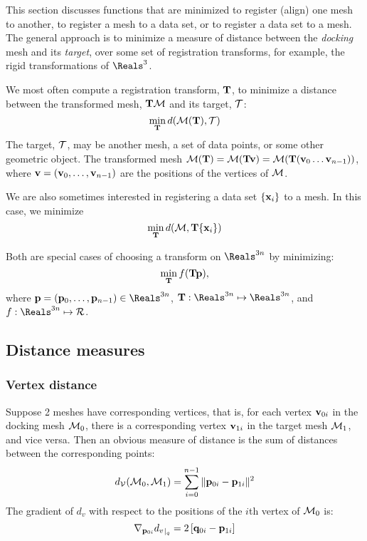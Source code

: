 \label{sec:registration}

This section discusses functions that are minimized
to register (align) one mesh to another,
to register a mesh to a data set,
or to register a data set to a mesh.
The general approach is to minimize
a measure of distance between the {\it docking} mesh and its {\it target},
over some set of registration transforms,
for example, the rigid transformations of $\Reals^3$.

We most often compute a registration transform, ${\mathbf T}$,
to minimize a distance between the transformed mesh,
${\mathbf T}{\mathcal M}$ and its target, ${\mathcal T}$:
\begin{equation}
\min_{{\mathbf T}} d({\mathcal M}({\mathbf T}),{\mathcal T})
\end{equation}
The target, ${\mathcal T}$, may be another mesh, a set of data points,
or some other geometric object.
The transformed mesh
${\mathcal M}({\mathbf T}) = {\mathcal M}({\mathbf T}{\mathbf v}) = {\mathcal M}({\mathbf T}({\mathbf v}_0 \ldots {\mathbf v}_{n-1}))$,
where ${\mathbf v} = ({\mathbf v}_0, \ldots , {\mathbf v}_{n-1})$
are the positions of the vertices of ${\mathcal M}$.

We are also sometimes interested in registering a data set
$\{{\mathbf x}_i\}$ to a mesh.
In this case, we minimize
\begin{equation}
\min_{{\mathbf T}} d({\mathcal M},{\mathbf T}\{{\mathbf x}_i\})
\end{equation}

Both are special cases of choosing a transform on $\Reals^{3n}$
by minimizing:
\begin{equation}
\min_{{\mathbf T}} f( {\mathbf T} {\mathbf p}),
\end{equation}
where
$\p = (\p_0, \ldots , \p_{n-1}) \in \Reals^{3n}$,
$\Tr : \Reals^{3n} \mapsto \Reals^{3n}$,
and
$f : \Reals^{3n} \mapsto \Re$.

\subsection{Distance measures}
\label{sec:Distance-measures}

\subsubsection{Vertex distance}
\label{sec:Vertex-distance}

Suppose 2 meshes have corresponding vertices,
that is,
for each vertex ${\mathbf v}_{0i}$ in the docking mesh ${\mathcal M}_0$,
there is a corresponding vertex ${\mathbf v}_{1i}$ in the target mesh ${\mathcal M}_1$,
and vice versa.
Then an obvious measure of distance
is the sum of distances between the corresponding points:
\begin{equation}
d_{{\mathcal V}}({\mathcal M}_0,{\mathcal M}_1) = \sum_{i=0}^{n-1} \| {\mathbf p}_{0i} - {\mathbf p}_{1i} \|^2
\end{equation}
The gradient of $d_v$ with respect to the positions
of the $i$th vertex of ${\mathcal M}_0$ is:
\begin{equation}
{\mathbf \nabla}_{{\mathbf p}_{0i}}{{d_v}}_{\mid_{q}} = 2 \left[ {\mathbf q}_{0i} - {\mathbf p}_{1i} \right]
\end{equation}

